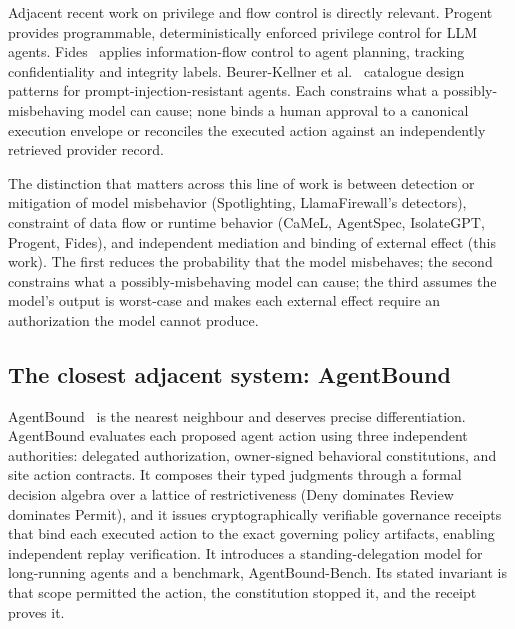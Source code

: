 \documentclass[11pt,letterpaper]{article}
\begin{document}
Adjacent recent work on privilege and flow control is directly relevant. Progent~\cite{progent2025} provides programmable, deterministically enforced privilege control for LLM agents. Fides~\cite{costa2025} applies information-flow control to agent planning, tracking confidentiality and integrity labels. Beurer-Kellner et al.~\cite{beurerkellner2025} catalogue design patterns for prompt-injection-resistant agents. Each constrains what a possibly-misbehaving model can cause; none binds a human approval to a canonical execution envelope or reconciles the executed action against an independently retrieved provider record.

The distinction that matters across this line of work is between detection or mitigation of model misbehavior (Spotlighting, LlamaFirewall's detectors), constraint of data flow or runtime behavior (CaMeL, AgentSpec, IsolateGPT, Progent, Fides), and independent mediation and binding of external effect (this work). The first reduces the probability that the model misbehaves; the second constrains what a possibly-misbehaving model can cause; the third assumes the model's output is worst-case and makes each external effect require an authorization the model cannot produce.

\subsection{The closest adjacent system: AgentBound}\label{sec:related-agentbound}

AgentBound~\cite{kaul2026} is the nearest neighbour and deserves precise differentiation. AgentBound evaluates each proposed agent action using three independent authorities: delegated authorization, owner-signed behavioral constitutions, and site action contracts. It composes their typed judgments through a formal decision algebra over a lattice of restrictiveness (Deny dominates Review dominates Permit), and it issues cryptographically verifiable governance receipts that bind each executed action to the exact governing policy artifacts, enabling independent replay verification. It introduces a standing-delegation model for long-running agents and a benchmark, AgentBound-Bench. Its stated invariant is that scope permitted the action, the constitution stopped it, and the receipt proves it.
\end{document}
